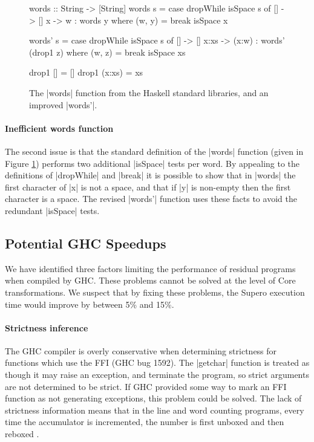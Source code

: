 \begin{figure}
\begin{code}
words :: String -> [String]
words s = case  dropWhile isSpace s of
                []  ->  []
                x   ->  w : words y
                        where (w, y) = break isSpace x

words' s = case  dropWhile isSpace s of
                 []    ->  []
                 x:xs  ->  (x:w) : words' (drop1 z)
                           where (w, z) = break isSpace xs

drop1 []      = []
drop1 (x:xs)  = xs
\end{code}
\caption{The |words| function from the Haskell standard libraries, and an improved |words'|.}
\label{fig:words}
\end{figure}

\paragraph{Inefficient \textsf{words} function}

The second issue is that the standard definition of the |words| function (given in Figure \ref{fig:words}) performs two additional |isSpace| tests per word. By appealing to the definitions of |dropWhile| and |break| it is possible to show that in |words| the first character of |x| is not a space, and that if |y| is non-empty then the first character is a space. The revised |words'| function uses these facts to avoid the redundant |isSpace| tests.

\subsection{Potential GHC Speedups}


We have identified three factors limiting the performance of residual programs when compiled by GHC. These problems cannot be solved at the level of Core transformations. We suspect that by fixing these problems, the Supero execution time would improve by between 5\% and 15\%.

\paragraph{Strictness inference}

The GHC compiler is overly conservative when determining strictness for functions which use the FFI (GHC bug 1592). The |getchar| function is treated as though it may raise an exception, and terminate the program, so strict arguments are not determined to be strict. If GHC provided some way to mark an FFI function as not generating exceptions, this problem could be solved. The lack of strictness information means that in the line and word counting programs, every time the accumulator is incremented, the number is first unboxed and then reboxed \cite{spj:unboxing}.

